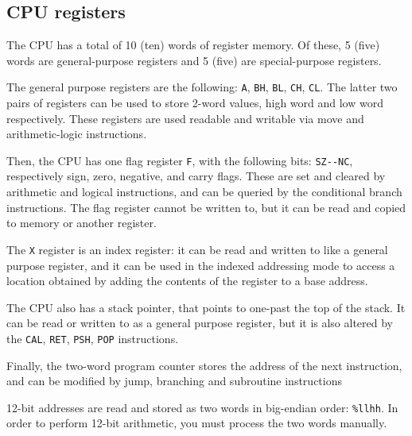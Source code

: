 \documentclass[a5paper,onecolumn,final,10pt]{memoir}
\let\ttt\texttt
\begin{document}
\subsection*{CPU registers}

The CPU has a total of 10 (ten) words of register memory. 
Of these, 5 (five) words are general-purpose registers 
and 5 (five) are special-purpose registers. 

The general purpose registers are the following: \ttt{A}, \ttt{BH}, \ttt{BL}, \ttt{CH}, \ttt{CL}. 
The latter two pairs of registers can be used to store 2-word values, high word and low word respectively. 
These registers are used readable and writable via move and arithmetic-logic instructions. 

Then, the CPU has one flag register \ttt{F}, with the following bits: \verb|SZ--NC|, respectively sign, zero, negative, and carry flags. 
These are set and cleared by arithmetic and logical instructions, 
and can be queried by the conditional branch instructions. 
The flag register cannot be written to, but it can be read and copied to memory or another register. 

The \ttt{X} register is an index register: it can be read and written to like a general purpose register, 
and it can be used in the indexed addressing mode to access a location obtained by adding the contents of the register to a base address. 

The CPU also has a stack pointer, that points to one-past the top of the stack. 
It can be read or written to as a general purpose register, but it is also altered by the \ttt{CAL}, \ttt{RET}, \ttt{PSH}, \ttt{POP} instructions. 

Finally, the two-word program counter stores the address of the next instruction, and can be modified by jump, branching and subroutine instructions

12-bit addresses are read and stored as two words in big-endian order: \ttt{\%llhh}.
In order to perform 12-bit arithmetic, you must process the two words manually.\footnotemark

\end{document}
